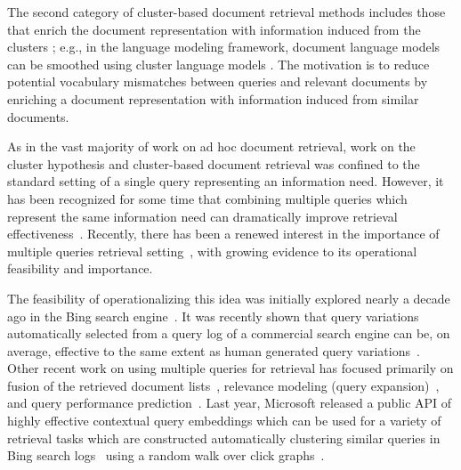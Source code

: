The second category of cluster-based document retrieval methods
includes those that enrich the document representation with
information induced from the clusters
\cite{Singhal+Pereira:99a,Kurland+Lee:04a,Liu+Croft:04a,Kurland:09a};
e.g., in the language modeling framework, document language models
can be smoothed using cluster language models
\cite{Kurland+Lee:04a,Liu+Croft:04a,Kurland:09a}.
The motivation is to reduce potential vocabulary mismatches between
queries and relevant documents by enriching a document
representation with information induced from similar documents.

As in the vast majority of work on ad hoc document retrieval, work on
the cluster hypothesis and cluster-based document retrieval was
confined to the standard setting of a single query representing an
information need.
However, it has been recognized for some time that combining multiple
queries which represent the same information need can dramatically
improve retrieval effectiveness~\cite{Belkin+al:93a,Belkin+al:95a}.
Recently, there has been a renewed interest in the importance of
multiple queries retrieval
setting~\cite{bailey2016uqv100,bailey2017retrieval,bc17-adcs,Thomas+al:17a,Benham+al:19a,Liu+al:19a,Lu+al:19a,Zendel+al:19a},
with growing evidence to its operational feasibility and importance.

The feasibility of operationalizing this idea was initially explored
nearly a decade ago in the Bing search engine~{\cite{Sheldon+al:11a}}.
It was recently shown that query variations automatically selected
from a query log of a commercial search engine can be, on average,
effective to the same extent as human generated query
variations~\cite{Liu+al:19a}.
Other recent work on using multiple queries for retrieval has focused
primarily on fusion of the retrieved document
lists~\cite{Belkin+al:93a,Belkin+al:95a,Pickens+al:08a,bailey2017retrieval,bc17-adcs}, relevance modeling (query expansion)~\cite{Lu+al:19a}, and
query performance prediction~{\cite{Zendel+al:19a}}.
Last year, Microsoft released a public API of highly effective
contextual query embeddings which can be used for a variety of
retrieval tasks which are constructed automatically clustering
similar queries in Bing search logs~{\cite{zhang2019generic}} using
a random walk over click
graphs~{\cite{craswell2007random,Sheldon+al:11a,Liu+al:19a}}.

